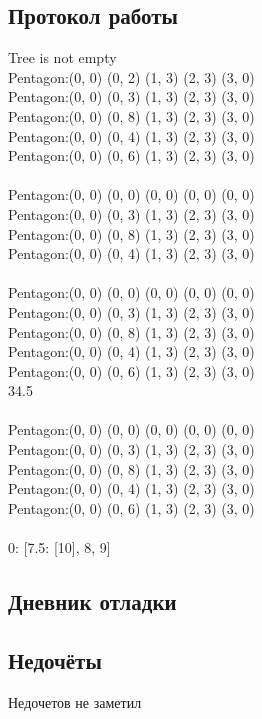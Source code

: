 \documentclass[12pt]{article}
\begin{document}
\subsection*{Протокол работы}
Tree is not empty \\
Pentagon:(0, 0) (0, 2) (1, 3) (2, 3) (3, 0) \\
Pentagon:(0, 0) (0, 3) (1, 3) (2, 3) (3, 0) \\
Pentagon:(0, 0) (0, 8) (1, 3) (2, 3) (3, 0) \\
Pentagon:(0, 0) (0, 4) (1, 3) (2, 3) (3, 0) \\
Pentagon:(0, 0) (0, 6) (1, 3) (2, 3) (3, 0) \\
 \\
Pentagon:(0, 0) (0, 0) (0, 0) (0, 0) (0, 0) \\
Pentagon:(0, 0) (0, 3) (1, 3) (2, 3) (3, 0) \\
Pentagon:(0, 0) (0, 8) (1, 3) (2, 3) (3, 0) \\
Pentagon:(0, 0) (0, 4) (1, 3) (2, 3) (3, 0) \\
 \\
Pentagon:(0, 0) (0, 0) (0, 0) (0, 0) (0, 0) \\
Pentagon:(0, 0) (0, 3) (1, 3) (2, 3) (3, 0) \\
Pentagon:(0, 0) (0, 8) (1, 3) (2, 3) (3, 0) \\
Pentagon:(0, 0) (0, 4) (1, 3) (2, 3) (3, 0) \\
Pentagon:(0, 0) (0, 6) (1, 3) (2, 3) (3, 0) \\
34.5 \\
 \\
Pentagon:(0, 0) (0, 0) (0, 0) (0, 0) (0, 0) \\
Pentagon:(0, 0) (0, 3) (1, 3) (2, 3) (3, 0) \\
Pentagon:(0, 0) (0, 8) (1, 3) (2, 3) (3, 0) \\
Pentagon:(0, 0) (0, 4) (1, 3) (2, 3) (3, 0) \\
Pentagon:(0, 0) (0, 6) (1, 3) (2, 3) (3, 0) \\
 \\
0: [7.5: [10], 8, 9] \\

\subsection*{Дневник отладки}


\subsection*{Недочёты}
Недочетов не заметил
\end{document}

